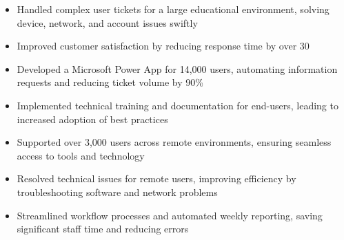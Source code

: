 \par\bigskip
{}
\par\smallskip
\begin{minipage}{13.75cm}
  \begin{minipage}{6.5cm}
    \begin{itemize}
      \item Handled complex user tickets for a large educational environment, solving device, network, and account issues swiftly
      \item Improved customer satisfaction by reducing response time by over 30%
    \end{itemize}
  \end{minipage}
  \hfill
  \begin{minipage}{6.5cm}
    \begin{itemize}
      \item Developed a Microsoft Power App for 14,000 users, automating information requests and reducing ticket volume by 90\%
      \item Implemented technical training and documentation for end-users, leading to increased adoption of best practices
    \end{itemize}
  \end{minipage}
\end{minipage}
\par\smallskip
\divider

\par\smallskip
\begin{minipage}{13.75cm}
  \begin{minipage}{6.5cm}
    \begin{itemize}
      \item Supported over 3,000 users across remote environments, ensuring seamless access to tools and technology
      \item Resolved technical issues for remote users, improving efficiency by troubleshooting software and network problems
    \end{itemize}
  \end{minipage}
  \hfill
  \begin{minipage}{6.5cm}
    \begin{itemize}
      \item Streamlined workflow processes and automated weekly reporting, saving significant staff time and reducing errors
    \end{itemize}
  \end{minipage}
\end{minipage}

